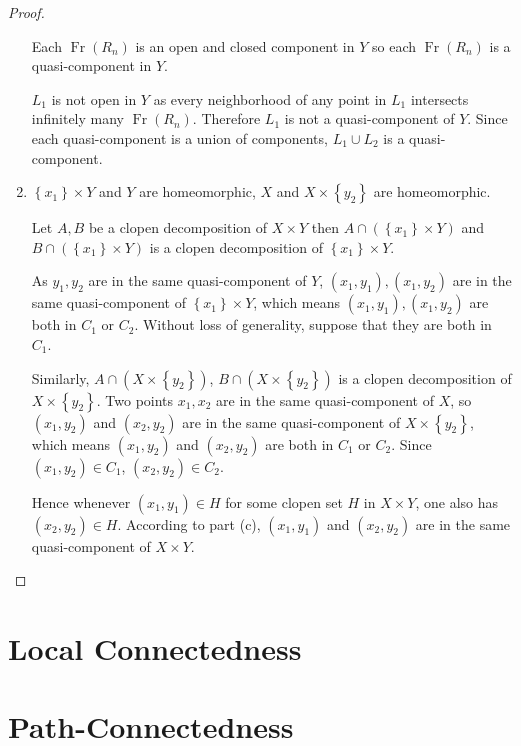 \begin{proof}
\begin{enumerate}[label={(\alph*)}]
		      \bigskip
		      Each \( \operatorname{Fr}(R_{n}) \) is an open and closed component in \( Y \) so each \( \operatorname{Fr}(R_{n}) \) is a quasi-component in \( Y \).

		      \( L_{1} \) is not open in \( Y \) as every neighborhood of any point in \( L_{1} \) intersects infinitely many \( \operatorname{Fr}(R_{n}) \). Therefore \( L_{1} \) is not a quasi-component of \( Y \). Since each quasi-component is a union of components, \( L_{1} \cup L_{2} \) is a quasi-component.
		\item \( \left\{ x_{1} \right\} \times Y \) and \( Y \) are homeomorphic, \( X \) and \( X \times \left\{ y_{2} \right\} \) are homeomorphic.

		      Let \( A, B \) be a clopen decomposition of \( X \times Y \) then \( A \cap (\left\{ x_{1} \right\} \times Y) \) and \( B \cap (\left\{ x_{1} \right\} \times Y) \) is a clopen decomposition of \( \left\{ x_{1} \right\} \times Y \).

		      As \( y_{1}, y_{2} \) are in the same quasi-component of \( Y \), \( (x_{1}, y_{1}), (x_{1}, y_{2}) \) are in the same quasi-component of \( \left\{ x_{1} \right\} \times Y \), which means \( (x_{1}, y_{1}), (x_{1}, y_{2}) \) are both in \( C_{1} \) or \( C_{2} \). Without loss of generality, suppose that they are both in \( C_{1} \).

		      Similarly, \( A \cap (X \times \left\{ y_{2} \right\}) \), \( B \cap (X \times \left\{ y_{2} \right\}) \) is a clopen decomposition of \( X \times \left\{ y_{2} \right\} \). Two points \( x_{1}, x_{2} \) are in the same quasi-component of \( X \), so \( (x_{1}, y_{2}) \) and \( (x_{2}, y_{2}) \) are in the same quasi-component of \( X \times \left\{ y_{2} \right\} \), which means \( (x_{1}, y_{2}) \) and \( (x_{2}, y_{2}) \) are both in \( C_{1} \) or \( C_{2} \). Since \( (x_{1}, y_{2}) \in C_{1} \), \( (x_{2}, y_{2}) \in C_{2} \).

		      Hence whenever \( (x_{1}, y_{1}) \in H \) for some clopen set \( H \) in \( X \times Y \), one also has \( (x_{2}, y_{2}) \in H \). According to part (c), \( (x_{1}, y_{1}) \) and \( (x_{2}, y_{2}) \) are in the same quasi-component of \( X \times Y \).
	\end{enumerate}
\end{proof}

\section{Local Connectedness}

\section{Path-Connectedness}

